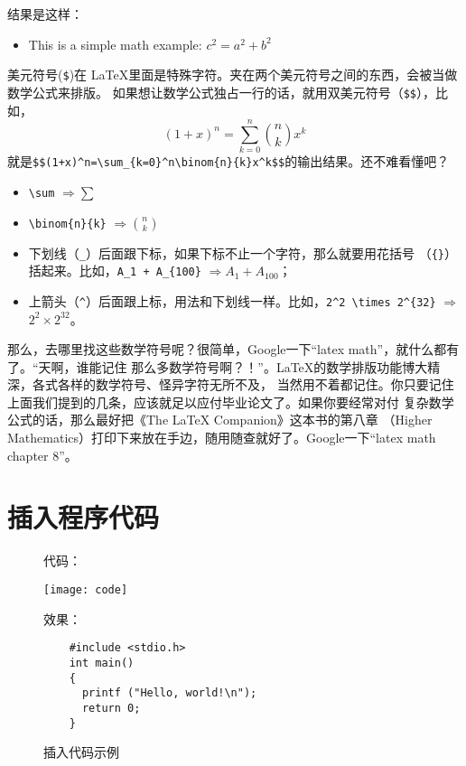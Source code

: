 结果是这样：

\begin{itemize}
\item[] This is a simple math example: $c^2=a^2+b^2$
\end{itemize}

美元符号(\verb'$')在 \LaTeX{}里面是特殊字符。夹在两个美元符号之间的东西，会被当做数学公式来排版。
如果想让数学公式独占一行的话，就用双美元符号（\verb'$$'），比如，
$$(1+x)^n=\sum_{k=0}^n\binom{n}{k}x^k$$
就是\verb'$$(1+x)^n=\sum_{k=0}^n\binom{n}{k}x^k$$'的输出结果。还不难看懂吧？

\begin{itemize}
\item \verb'\sum' $\Rightarrow\sum$
\item \verb'\binom{n}{k}' $\Rightarrow\binom{n}{k}$
\item 下划线（\texttt{\_}）后面跟下标，如果下标不止一个字符，那么就要用花括号
  （\texttt{\{\}}）括起来。比如，\verb'A_1 + A_{100}' $\Rightarrow{}A_1 + A_{100}$；
\item 上箭头（\verb'^'）后面跟上标，用法和下划线一样。比如，\verb'2^2 \times 2^{32}'
  $\Rightarrow$ $2^2\times{}2^{32}$。 
\end{itemize}

那么，去哪里找这些数学符号呢？很简单，Google一下“latex math”，就什么都有了。“天啊，谁能记住
那么多数学符号啊？！”。\LaTeX{}的数学排版功能博大精深，各式各样的数学符号、怪异字符无所不及，
当然用不着都记住。你只要记住上面我们提到的几条，应该就足以应付毕业论文了。如果你要经常对付
复杂数学公式的话，那么最好把《The \LaTeX{} Companion》\cite{Goossens94a}这本书的第八章
（Higher Mathematics）打印下来放在手边，随用随查就好了。Google一下“latex math chapter 8”。

\section{插入程序代码}
\label{sec:code}

\begin{figure}
  \centering
\begin{minipage}[t]{.45\linewidth}
  代码：
  \begin{center}
    \texttt{[image: code]}
  \end{center}
\end{minipage}
\hfill\vline\hfill
\begin{minipage}[t]{.45\linewidth}
  效果：
  \vspace{4.6em}
  \begin{verbatim}
    #include <stdio.h>
    int main()
    {
      printf ("Hello, world!\n");
      return 0;
    }
  \end{verbatim}
\end{minipage}
  \caption{插入代码示例}\label{fig:code}
\end{figure}

